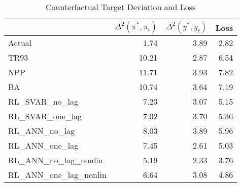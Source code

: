 \begin{table}
\caption{Counterfactual Target Deviation and Loss}
\label{tab:counterfactual_loss}
\begin{tabular}{lrrr}
\toprule
 & $\Delta^2(\pi^*, \pi_t)$ & $\Delta^2(y^*, y_t)$ & Loss \\
\midrule
Actual & 1.74 & 3.89 & 2.82 \\
TR93 & 10.21 & 2.87 & 6.54 \\
NPP & 11.71 & 3.93 & 7.82 \\
BA & 10.74 & 3.64 & 7.19 \\
RL_SVAR_no_lag & 7.23 & 3.07 & 5.15 \\
RL_SVAR_one_lag & 7.02 & 3.70 & 5.36 \\
RL_ANN_no_lag & 8.03 & 3.89 & 5.96 \\
RL_ANN_one_lag & 7.45 & 2.61 & 5.03 \\
RL_ANN_no_lag_nonlin & 5.19 & 2.33 & 3.76 \\
RL_ANN_one_lag_nonlin & 6.64 & 3.08 & 4.86 \\
\bottomrule
\end{tabular}
\end{table}
